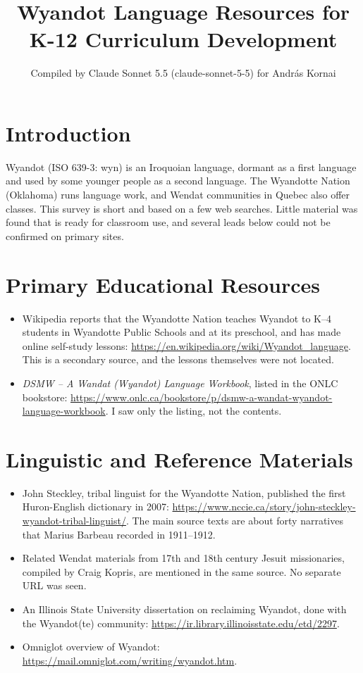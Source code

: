 \documentclass[12pt]{article}
\title{Wyandot Language Resources for K-12 Curriculum Development}
\author{Compiled by Claude Sonnet 5.5 (claude-sonnet-5-5) for Andr\'as Kornai}
\date{}
\begin{document}
\maketitle

\section{Introduction}
Wyandot (ISO 639-3: wyn) is an Iroquoian language, dormant as a first language and used by some younger people as a second language. The Wyandotte Nation (Oklahoma) runs language work, and Wendat communities in Quebec also offer classes. This survey is short and based on a few web searches. Little material was found that is ready for classroom use, and several leads below could not be confirmed on primary sites.

\section{Primary Educational Resources}
\begin{itemize}
\item Wikipedia reports that the Wyandotte Nation teaches Wyandot to K--4 students in Wyandotte Public Schools and at its preschool, and has made online self-study lessons: \url{https://en.wikipedia.org/wiki/Wyandot_language}. This is a secondary source, and the lessons themselves were not located.
\item \emph{DSMW -- A Wandat (Wyandot) Language Workbook}, listed in the ONLC bookstore: \url{https://www.onlc.ca/bookstore/p/dsmw-a-wandat-wyandot-language-workbook}. I saw only the listing, not the contents.
\end{itemize}

\section{Linguistic and Reference Materials}
\begin{itemize}
\item John Steckley, tribal linguist for the Wyandotte Nation, published the first Huron-English dictionary in 2007: \url{https://www.nccie.ca/story/john-steckley-wyandot-tribal-linguist/}. The main source texts are about forty narratives that Marius Barbeau recorded in 1911--1912.
\item Related Wendat materials from 17th and 18th century Jesuit missionaries, compiled by Craig Kopris, are mentioned in the same source. No separate URL was seen.
\item An Illinois State University dissertation on reclaiming Wyandot, done with the Wyandot(te) community: \url{https://ir.library.illinoisstate.edu/etd/2297}.
\item Omniglot overview of Wyandot: \url{https://mail.omniglot.com/writing/wyandot.htm}.
\end{itemize}
\end{document}
